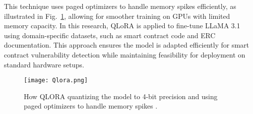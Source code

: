 This technique uses paged optimizers to handle memory spikes efficiently, as illustrated in Fig.~\ref{fig:qlora}, allowing for smoother training on GPUs with limited memory capacity. In this research, QLoRA is applied to fine-tune LLaMA 3.1 using domain-specific datasets, such as smart contract code and ERC documentation. This approach ensures the model is adapted efficiently for smart contract vulnerability detection while maintaining feasibility for deployment on standard hardware setups.

\begin{figure}[h!]
    \centering
    \texttt{[image: Qlora.png]}
    \caption{How QLORA quantizing the model to 4-bit precision and using paged optimizers to handle memory spikes \cite{dettmers2023qlora}.}
    \label{fig:qlora}
\end{figure}